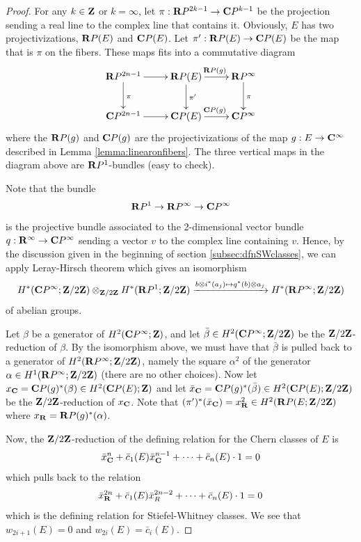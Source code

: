 \documentclass[a4paper,openany]{scrbook}
\begin{document}
\begin{proof}
 For any $k\in\mathbf Z$ or $k=\infty$, let $\pi: \mathbf R P^{2k-1}\to \mathbf C P^{k-1}$ be the projection sending a real line to the complex line that contains it. Obviously, $E$ has two projectivizations, $\mathbf R P(E)$ and $\mathbf C P(E)$. Let 
 $\pi':\mathbf R P(E)\to \mathbf C P(E)$ be the map that is $\pi$ on the fibers.
 These maps fits into a commutative diagram
 $$\xymatrix{\R P^{2n-1}\ar[r]\ar[d]^\pi & \R P(E)\ar[r]^{\R P(g)}\ar[d]^{\pi'} & \R P^\infty\ar[d]^\pi\\
 \CP^{2n-1}\ar[r] & \CP(E)\ar[r]^{\CP(g)} & \CP^\infty}
 $$
 where the $\mathbf R P(g)$ and $\mathbf C P(g)$ are the projectivizations of the map $g:E\to\mathbf C^\infty$ described in Lemma \ref{lemma:linearonfibers}. The three vertical maps in the diagram above are $\mathbf R P^1$-bundles (easy to check).
 
 Note that the bundle 
 $$\mathbf R P^1\to \mathbf R P^\infty\to\mathbf C P^\infty$$ is the projective bundle associated to the 2-dimensional vector bundle $q: \mathbf R^\infty\to\mathbf C P^\infty$ sending a vector $v$ to the complex line containing $v$. Hence, by the discussion given in the beginning of section \ref{subsec:dfnSWclasses}, we can apply Leray-Hirsch theorem which gives an isomorphism
 $$H^*(\mathbf C P^\infty;\mathbf Z/2\mathbf Z)\otimes_{\mathbf Z/2\mathbf Z} H^*(\mathbf R P^1;\mathbf Z/2\mathbf Z)\xrightarrow{b\otimes i^*(a_j)\mapsto q^*(b)\otimes a_j}H^*(\mathbf R P^\infty;\mathbf Z/2\mathbf Z)$$ of abelian groups. 
 
 Let $\beta$ be a generator of $H^2(\mathbf C P^\infty;\mathbf Z)$, and let $\bar\beta\in H^2(\mathbf C P^\infty;\mathbf Z/2\mathbf Z)$ be the $\mathbf Z/2\mathbf Z$-reduction of $\beta$. By the isomorphism above, we must have that $\bar\beta$ is pulled back to a generator of $H^2(\mathbf R P^\infty; \mathbf Z/2\mathbf Z)$, namely the square $\alpha^2$ of the generator $\alpha\in H^1(\mathbf R P^\infty;\mathbf Z/2\mathbf Z)$ (there are no other choices).
 Now let $x_\mathbf C = \mathbf C P(g)^*(\beta)\in H^2(\mathbf C P(E);\mathbf Z)$ and let $\bar x_\mathbf C = \mathbf C P(g)^*(\bar\beta)\in H^2(\mathbf C P(E);\mathbf Z/2\mathbf Z)$ be the $\mathbf Z/2\mathbf Z$-reduction of $x_\mathbf C$. Note that $(\pi')^*(\bar x_\mathbf C)=x_\mathbf R^2\in H^2(\mathbf R P(E;\mathbf Z/2\mathbf Z)$ where $x_\mathbf R = \mathbf R P(g)^*(\alpha)$.
 
 Now, the $\mathbf Z/2\mathbf Z$-reduction of the defining relation for the Chern classes of $E$ is
 $$\bar x_\mathbf C^n + \bar c_{1}(E)\bar x_\mathbf C^{n-1}+\cdots+\bar c_{n}(E)\cdot 1 = 0$$ which pulls back to the relation  $$\bar x_\mathbf R^{2n} + \bar c_{1}(E)\bar x_R^{2n-2}+\cdots+\bar c_{n}(E)\cdot 1 = 0$$ which is the defining relation for Stiefel-Whitney classes. We see that $w_{2i+1}(E)=0$ and $w_{2i}(E)=\bar c_i(E)$.
\end{proof}  
\end{document}
